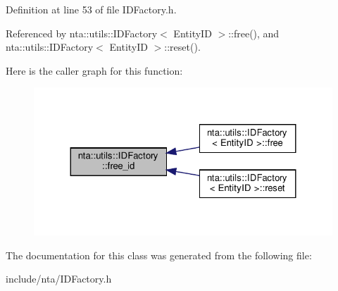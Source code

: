 Definition at line 53 of file I\+D\+Factory.\+h.



Referenced by nta\+::utils\+::\+I\+D\+Factory$<$ Entity\+I\+D $>$\+::free(), and nta\+::utils\+::\+I\+D\+Factory$<$ Entity\+I\+D $>$\+::reset().

Here is the caller graph for this function\+:
\nopagebreak
\begin{figure}[H]
\begin{center}
\leavevmode
\includegraphics[width=324pt]{d6/d62/classnta_1_1utils_1_1IDFactory_ac136bf7941dcdc20ed51c680aaf4a369_icgraph}
\end{center}
\end{figure}


The documentation for this class was generated from the following file\+:\begin{DoxyCompactItemize}
\item 
include/nta/I\+D\+Factory.\+h\end{DoxyCompactItemize}

